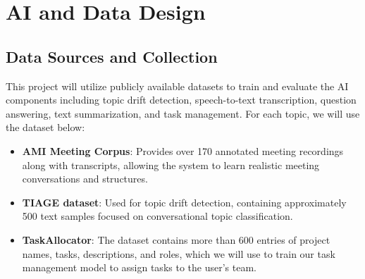 \raggedright
\section{AI and Data Design}
\label{section:ai-data-design}
\raggedright
\subsection{Data Sources and Collection}
{
    \setlength{\parindent}{2em}
    This project will utilize publicly available datasets to train and evaluate the AI components including topic drift detection, speech-to-text transcription, question answering, text summarization, and task management. For each topic, we will use the dataset below:
    \begin{itemize}
        \item \textbf{AMI Meeting Corpus}: Provides over 170 annotated meeting recordings along with transcripts, allowing the system to learn realistic meeting conversations and structures.
        \item \textbf{TIAGE dataset}: Used for topic drift detection, containing approximately 500 text samples focused on conversational topic classification.
        \item \textbf{TaskAllocator}: The dataset contains more than 600 entries of project names, tasks, descriptions, and roles, which we will use to train our task management model to assign tasks to the user's team.
    \end{itemize}
}

